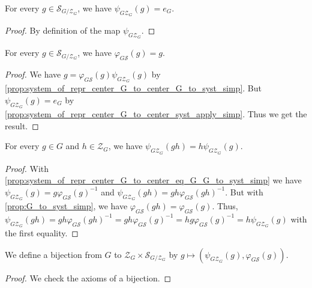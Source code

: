 \begin{proposition}
    \label{prop:system_of_repr_center_G_to_center_syst_apply_simp}
    \leanok
    For every $g\in \mathcal{S}_{G/\mathcal{Z}_G}$, we have $\psi_{G\mathcal{Z}_G}(g)=e_G$.
\end{proposition}
\begin{proof}
    \leanok
    By definition of the map $\psi_{G\mathcal{Z}_G}$.
\end{proof}

\begin{proposition}
    \label{prop:system_of_repr_center_G_to_syst_simp_id}
    \leanok
    For every $g\in \mathcal{S}_{G/\mathcal{Z}_G}$, we have $\varphi_{G\mathcal{S}}(g)=g$.
\end{proposition}
\begin{proof}
    \leanok
    We have $g=\varphi_{G\mathcal{S}}(g) \psi_{G\mathcal{Z}_G}(g)$ by \ref{prop:system_of_repr_center_G_to_center_G_to_syst_simp}.
    But $\psi_{G\mathcal{Z}_G}(g)=e_G$ by \ref{prop:system_of_repr_center_G_to_center_syst_apply_simp}.
    Thus we get the result.
\end{proof}

\begin{proposition}
    \label{prop:system_of_repr_center_G_to_center_mul_simp}
    \leanok
    For every $g\in G$ and $h\in\mathcal{Z}_G$, we have $\psi_{G\mathcal{Z}_G}(gh)=h\psi_{G\mathcal{Z}_G}(g)$.
\end{proposition}
\begin{proof}
    \leanok
    With \ref{prop:system_of_repr_center_G_to_center_eq_G_G_to_syst_simp} we have $\psi_{G\mathcal{Z}_G}(g)=g\varphi_{G\mathcal{S}}(g)^{-1}$
    and $\psi_{G\mathcal{Z}_G}(gh)=gh\varphi_{G\mathcal{S}}(gh)^{-1}$.
    But with \ref{prop:G_to_syst_simp}, we have $\varphi_{G\mathcal{S}}(gh)=\varphi_{G\mathcal{S}} (g)$.
    Thus, $\psi_{G\mathcal{Z}_G}(gh)=gh\varphi_{G\mathcal{S}}(gh)^{-1}=gh\varphi_{G\mathcal{S}} (g)^{-1}=
    hg\varphi_{G\mathcal{S}} (g)^{-1}=h\psi_{G\mathcal{Z}_G}(g)$ with the first equality.
\end{proof}

\begin{definition}
    \label{def:system_of_repr_center_set_center_iso_G}
    \leanok
    We define a bijection from $G$ to $\mathcal{Z}_G\times\mathcal{S}_{G/\mathcal{Z}_G}$ by 
    $g\mapsto (\psi_{G\mathcal{Z}_G}(g),\varphi_{G\mathcal{S}} (g))$.
    \begin{proof}
        \leanok
        We check the axioms of a bijection.
    \end{proof}
\end{definition}

